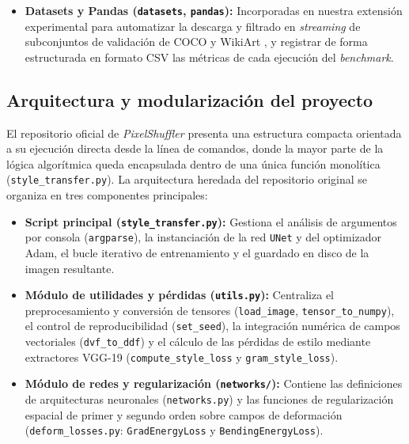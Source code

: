 \documentclass[a4paper]{article}
\begin{document}
\begin{itemize}
    \item \textbf{Datasets y Pandas (\texttt{datasets}, \texttt{pandas}):} Incorporadas en nuestra extensión experimental para automatizar la descarga y filtrado en \textit{streaming} de subconjuntos de validación de COCO \cite{lin2014microsoft} y WikiArt \cite{saleh2015large}, y registrar de forma estructurada en formato CSV las métricas de cada ejecución del \textit{benchmark}.
\end{itemize}

\subsection{Arquitectura y modularización del proyecto}

\noindent El repositorio oficial de \textit{PixelShuffler} \cite{zamzam2025repo} presenta una estructura compacta orientada a su ejecución directa desde la línea de comandos, donde la mayor parte de la lógica algorítmica queda encapsulada dentro de una única función monolítica (\texttt{style\_transfer.py}). La arquitectura heredada del repositorio original se organiza en tres componentes principales:

\begin{itemize}
    \item \textbf{Script principal (\texttt{style\_transfer.py}):} Gestiona el análisis de argumentos por consola (\texttt{argparse}), la instanciación de la red \texttt{UNet} y del optimizador Adam, el bucle iterativo de entrenamiento y el guardado en disco de la imagen resultante.
    
    \item \textbf{Módulo de utilidades y pérdidas (\texttt{utils.py}):} Centraliza el preprocesamiento y conversión de tensores (\texttt{load\_image}, \texttt{tensor\_to\_numpy}), el control de reproducibilidad (\texttt{set\_seed}), la integración numérica de campos vectoriales (\texttt{dvf\_to\_ddf}) y el cálculo de las pérdidas de estilo mediante extractores VGG-19 (\texttt{compute\_style\_loss} y \texttt{gram\_style\_loss}).
    
    \item \textbf{Módulo de redes y regularización (\texttt{networks/}):} Contiene las definiciones de arquitecturas neuronales (\texttt{networks.py}) y las funciones de regularización espacial de primer y segundo orden sobre campos de deformación (\texttt{deform\_losses.py}: \texttt{GradEnergyLoss} y \texttt{BendingEnergyLoss}).
\end{itemize}
\end{document}
